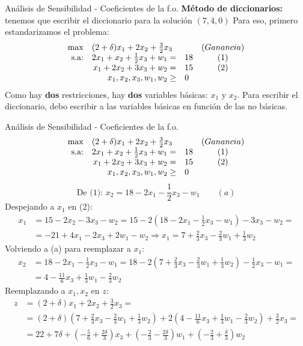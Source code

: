 \documentclass[10pt, aspectratio=169]{beamer}
\begin{document}
\begin{frame}{Análisis de Sensibilidad - Coeficientes de la f.o.}
    \textbf{Método de diccionarios:} tenemos que escribir el diccionario para la solución $(7,4,0)$ Para eso, primero estandarizamos el problema:
    $$
    \begin{array}{rrlc}
    \max & \multicolumn{2}{l}{(2+\delta)x_1+2x_2+\frac{3}{2}x_3} & (Ganancia)\\
    \text{s.a:}& 2x_1+x_2+\frac{1}{2}x_3 + w_1 = & 18 & (1)\\
     & x_1+2x_2+3x_3 + w_2 = & 15 & (2)\\
     & x_1, x_2, x_3, w_1, w_2\geq & 0 \\
    \end{array}
    $$
    Como hay \textbf{dos} restricciones, hay \textbf{dos} variables básicas: $x_1$ y $x_2$. Para escribir el diccionario, debo escribir a las variables básicas en función de las no básicas.

\end{frame}


\begin{frame}{Análisis de Sensibilidad - Coeficientes de la f.o.}\footnotesize
    $$
    \begin{array}{rrlc}
    \max & \multicolumn{2}{l}{(2+\delta)x_1+2x_2+\frac{3}{2}x_3} & (Ganancia)\\
    \text{s.a:}& 2x_1+x_2+\frac{1}{2}x_3 + w_1 = & 18 & (1)\\
     & x_1+2x_2+3x_3 + w_2 = & 15 & (2)\\
     & x_1, x_2, x_3, w_1, w_2\geq & 0 \\
    \end{array}
    $$
    \[ \text{De (1): } x_2= 18-2x_1-\frac{1}{2}x_3 - w_1  \qquad (a) \]
    Despejando a $x_1$ en (2):
    \begin{align*}
        x_1 &=15-2x_2-3x_3-w_2 = 15-2\left(18-2x_1-\frac{1}{2}x_3-w_1\right)-3x_3-w_2 = \\
        & = -21 +4x_1 -2x_3 +2w_1 - w_2 \Rightarrow x_1 = 7 + \frac{2}{3}x_3-\frac{2}{3}w_1+\frac{1}{3}w_2
    \end{align*}
    Volviendo a (a) para reemplazar a $x_1$:
    \begin{align*}
        x_2&= 18-2x_1-\frac{1}{2}x_3 - w_1 = 18-2\left(7+\frac{2}{3}x_3-\frac{2}{3}w_1+\frac{1}{3}w_2\right)-\frac{1}{2}x_3-w_1 = \\
        &= 4-\frac{11}{6}x_3+\frac{1}{3}w_1-\frac{2}{3}w_2
    \end{align*}
    Reemplazando a $x_1,x_2$ en $z$:
    \begin{align*}
        z &= (2+\delta)x_1+2x_2+\frac{3}{2}x_3 = \\
         & =(2+\delta)\left(7 + \frac{2}{3}x_3-\frac{2}{3}w_1+\frac{1}{3}w_2\right)+2\left(4-\frac{11}{6}x_3+\frac{1}{3}w_1-\frac{2}{3}w_2\right)+\frac{3}{2}x_3 = \\
         & = 22+7\delta+\left(-\frac{5}{6}+\frac{2\delta}{3}\right)x_3+\left(-\frac{2}{3}-\frac{2\delta}{3}\right)w_1+\left(-\frac{2}{3}+\frac{\delta}{3}\right)w_2
    \end{align*}
\end{frame}
\end{document}
